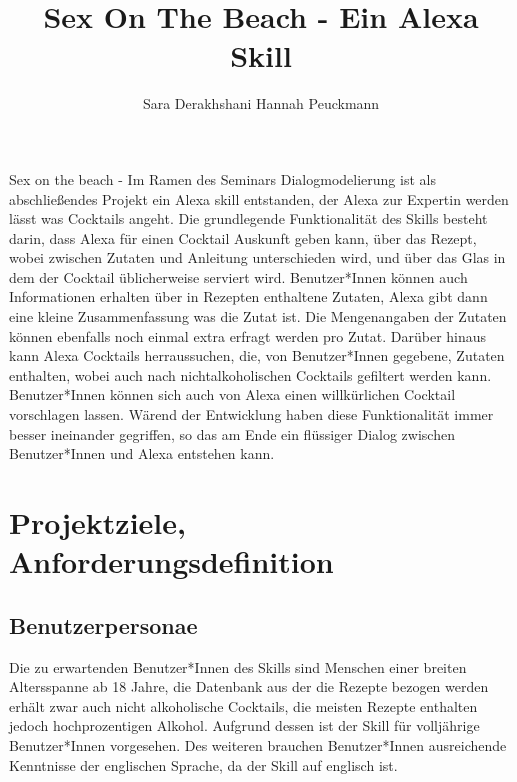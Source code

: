 \documentclass[12pt,letterpaper]{article}
\begin{document}
\title{Sex On The Beach - Ein Alexa Skill}
\author{Sara Derakhshani Hannah Peuckmann}
\maketitle
\thispagestyle{fancy}

Sex on the beach - Im Ramen des Seminars Dialogmodelierung ist als abschließendes Projekt ein
Alexa skill entstanden, der Alexa zur Expertin werden lässt was Cocktails angeht.
Die grundlegende Funktionalität des Skills besteht darin, dass Alexa für einen Cocktail Auskunft geben kann,
über das Rezept, wobei zwischen Zutaten und Anleitung unterschieden wird, und über das Glas in dem der Cocktail
üblicherweise serviert wird. Benutzer*Innen können auch Informationen erhalten über in Rezepten enthaltene Zutaten,
Alexa gibt dann eine kleine Zusammenfassung was die Zutat ist. Die Mengenangaben der Zutaten können ebenfalls noch einmal extra erfragt werden pro Zutat.
Darüber hinaus kann Alexa Cocktails herraussuchen, die, von Benutzer*Innen
gegebene, Zutaten enthalten, wobei auch nach nichtalkoholischen Cocktails gefiltert werden kann. 
Benutzer*Innen können sich auch von Alexa einen willkürlichen Cocktail vorschlagen lassen.
Wärend der Entwicklung haben diese Funktionalität immer besser ineinander gegriffen, so das am Ende ein flüssiger Dialog
zwischen Benutzer*Innen und Alexa entstehen kann.

\section{Projektziele, Anforderungsdefinition}
\subsection{Benutzerpersonae}
Die zu erwartenden Benutzer*Innen des Skills sind Menschen einer breiten Altersspanne ab 18 Jahre, die Datenbank aus der die Rezepte bezogen werden erhält zwar auch nicht alkoholische Cocktails, die meisten Rezepte enthalten jedoch hochprozentigen Alkohol. Aufgrund dessen ist der Skill für volljährige Benutzer*Innen vorgesehen. Des weiteren  brauchen Benutzer*Innen ausreichende Kenntnisse der englischen Sprache, da der Skill auf englisch ist.
\end{document}
